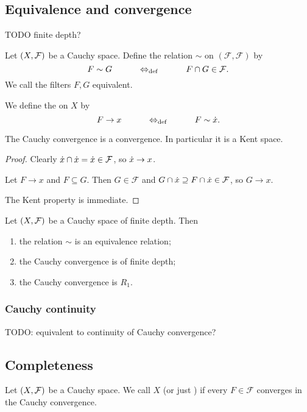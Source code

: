\subsection{Equivalence and convergence}
TODO finite depth?
\begin{definition}
Let $\left( X, \mathcal{F} \right)$ be a Cauchy space. Define the relation $\sim$ on $(\mathcal{F},\mathcal{F})$ by
\[ F \sim G \qquad \quad\Leftrightarrow_{\text{def}}\quad \qquad F\cap G \in \mathcal{F}. \]
We call the filters $F,G$ equivalent.

We define the  on $X$ by
\[ F \to x \qquad \quad\Leftrightarrow_{\text{def}}\quad \qquad F \sim \dot{x}. \]
\end{definition}

\begin{lemma}
The Cauchy convergence is a convergence. In particular it is a Kent space.
\end{lemma}
\begin{proof}
Clearly $\dot{x}\cap\dot{x} = \dot{x} \in \mathcal{F}$, so $\dot{x} \to x$.

Let $F\to x$ and $F\subseteq G$. Then $G\in \mathcal{F}$ and $G\cap \dot{x} \supseteq F \cap\dot{x} \in \mathcal{F}$, so $G \to x$.

The Kent property is immediate.
\end{proof}

\begin{proposition}
Let $\left( X, \mathcal{F} \right)$ be a Cauchy space of finite depth. Then
\begin{enumerate}
\item the relation $\sim$ is an equivalence relation;
\item the Cauchy convergence is of finite depth;
\item the Cauchy convergence is $R_1$.
\end{enumerate}
\end{proposition}

\subsubsection{Cauchy continuity}
TODO: equivalent to continuity of Cauchy convergence?

\subsection{Completeness}
\begin{definition}
Let $\left( X, \mathcal{F} \right)$ be a Cauchy space. We call $X$  (or just ) if every $F\in \mathcal{F}$ converges in the Cauchy convergence.
\end{definition}

